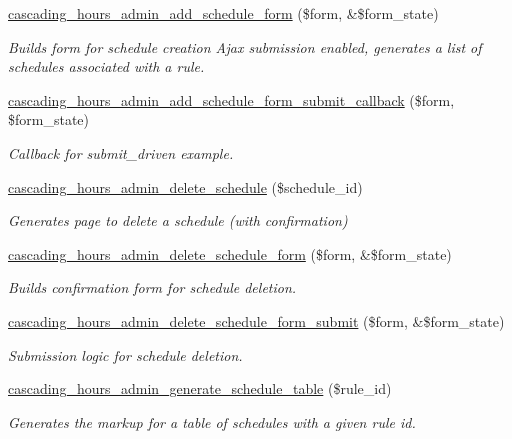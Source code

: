 \begin{DoxyCompactItemize}
\hyperlink{cascading__hours_8admin_8php_a9b2e894393962d6ff93edaa6771b8b70_a9b2e894393962d6ff93edaa6771b8b70}{cascading\+\_\+hours\+\_\+admin\+\_\+add\+\_\+schedule\+\_\+form} (\$form, \&\$form\+\_\+state)
\begin{DoxyCompactList}\small\item\em Builds form for schedule creation Ajax submission enabled, generates a list of schedules associated with a rule. \end{DoxyCompactList}\item 
\hyperlink{cascading__hours_8admin_8php_ad8222cb24e2caab8a061ea74d3f26c7b_ad8222cb24e2caab8a061ea74d3f26c7b}{cascading\+\_\+hours\+\_\+admin\+\_\+add\+\_\+schedule\+\_\+form\+\_\+submit\+\_\+callback} (\$form, \$form\+\_\+state)
\begin{DoxyCompactList}\small\item\em Callback for submit\+\_\+driven example. \end{DoxyCompactList}\item 
\hyperlink{cascading__hours_8admin_8php_a57b852e3ac3da923d48c0e65cffce2df_a57b852e3ac3da923d48c0e65cffce2df}{cascading\+\_\+hours\+\_\+admin\+\_\+delete\+\_\+schedule} (\$schedule\+\_\+id)
\begin{DoxyCompactList}\small\item\em Generates page to delete a schedule (with confirmation) \end{DoxyCompactList}\item 
\hyperlink{cascading__hours_8admin_8php_a883a2af8b6434faccc0ff58acc372d5a_a883a2af8b6434faccc0ff58acc372d5a}{cascading\+\_\+hours\+\_\+admin\+\_\+delete\+\_\+schedule\+\_\+form} (\$form, \&\$form\+\_\+state)
\begin{DoxyCompactList}\small\item\em Builds confirmation form for schedule deletion. \end{DoxyCompactList}\item 
\hyperlink{cascading__hours_8admin_8php_a4d1dc1a37c49d7cedb74aa92ecf04a74_a4d1dc1a37c49d7cedb74aa92ecf04a74}{cascading\+\_\+hours\+\_\+admin\+\_\+delete\+\_\+schedule\+\_\+form\+\_\+submit} (\$form, \&\$form\+\_\+state)
\begin{DoxyCompactList}\small\item\em Submission logic for schedule deletion. \end{DoxyCompactList}\item 
\hyperlink{cascading__hours_8admin_8php_a997aa68f4607a3ef09a3dee86881633f_a997aa68f4607a3ef09a3dee86881633f}{cascading\+\_\+hours\+\_\+admin\+\_\+generate\+\_\+schedule\+\_\+table} (\$rule\+\_\+id)
\begin{DoxyCompactList}\small\item\em Generates the markup for a table of schedules with a given rule id. \end{DoxyCompactList}\end{DoxyCompactItemize}



